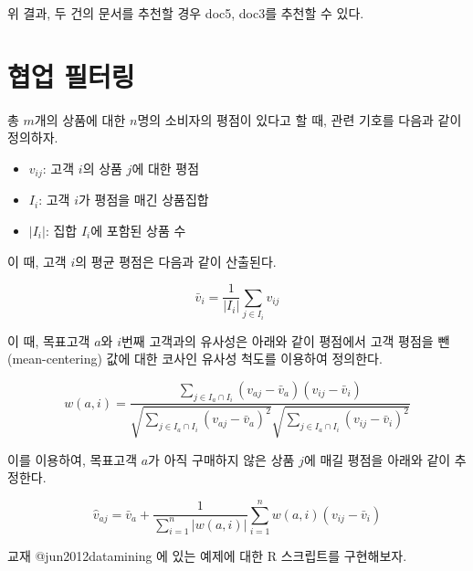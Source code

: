 \documentclass[]{book}
\providecommand{\tightlist}{%
  \setlength{\itemsep}{0pt}\setlength{\parskip}{0pt}}
\begin{document}
위 결과, 두 건의 문서를 추천할 경우 doc5, doc3를 추천할 수 있다.

\hypertarget{collaborative-filtering}{%
\section{협업 필터링}\label{collaborative-filtering}}

총 \(m\)개의 상품에 대한 \(n\)명의 소비자의 평점이 있다고 할 때, 관련 기호를 다음과 같이 정의하자.

\begin{itemize}
\tightlist
\item
  \(v_{ij}\): 고객 \(i\)의 상품 \(j\)에 대한 평점
\item
  \(I_i\): 고객 \(i\)가 평점을 매긴 상품집합
\item
  \(\left| I_i \right|\): 집합 \(I_i\)에 포함된 상품 수
\end{itemize}

이 때, 고객 \(i\)의 평균 평점은 다음과 같이 산출된다.

\begin{equation*}
\bar{v}_i  = \frac{1}{\left| I_i \right|} \sum_{j \in I_i} v_{ij}
\end{equation*}

이 때, 목표고객 \(a\)와 \(i\)번째 고객과의 유사성은 아래와 같이 평점에서 고객 평점을 뺀(mean-centering) 값에 대한 코사인 유사성 척도를 이용하여 정의한다.

\begin{equation*}
w(a, i) = \frac{\sum_{j \in I_a \cap I_i} (v_{aj} - \bar{v}_a) (v_{ij} - \bar{v}_i)}{\sqrt{\sum_{j \in I_a \cap I_i} (v_{aj} - \bar{v}_a)^2} \sqrt{\sum_{j \in I_a \cap I_i} (v_{ij} - \bar{v}_i)^2}}
\end{equation*}

이를 이용하여, 목표고객 \(a\)가 아직 구매하지 않은 상품 \(j\)에 매길 평점을 아래와 같이 추정한다.

\begin{equation*}
\hat{v}_{aj} = \bar{v}_a + \frac{1}{\sum_{i = 1}^{n} \left| w(a, i) \right|} \sum_{i = 1}^{n} w(a, i) (v_{ij} - \bar{v}_i)
\end{equation*}

교재 @jun2012datamining 에 있는 예제에 대한 R 스크립트를 구현해보자.
\end{document}

